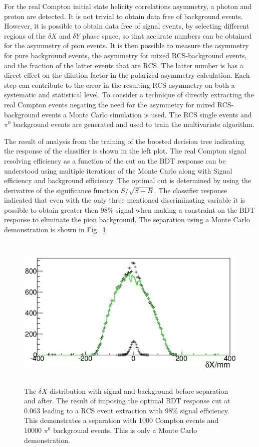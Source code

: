 For the real Compton initial state helicity correlations asymmetry, a photon and proton are detected.
It is not trivial to obtain data free of background events. However, it is possible to obtain
data free of signal events, by selecting different regions of the $\delta X$ and $\delta Y$ phase
space, so that accurate numbers can be obtained for the asymmetry of
pion events. It is then possible to measure the asymmetry for pure background events, the asymmetry for mixed
RCS-background events, and the fraction of the latter events that are RCS.  The latter number is
has a direct effect on the dilution factor in the polarized asymmetry calculation.
Each step can contribute to the error in the resulting RCS asymmetry on both a systematic 
and statistical level.  To consider a technique of
directly extracting the real Compton events negating the need for the asymmetry for mixed
RCS-background events a Monte Carlo simulation is used.  The RCS single events and $\pi^0$ background
events are generated and used to train the multivariate algorithm. 

The result of analysis from the training
of the boosted decision tree indicating the response of the classifier is shown in the left plot.
The real Compton signal resolving efficiency as a function of the cut on the BDT response can be understood using
multiple iterations of the Monte Carlo along with Signal efficiency and background efficiency.  The optimal cut is determined by
using the derivative of the significance function $S/\sqrt{S+B}$.
The classifier response indicated that even with the only three mentioned
discriminating variable it is possible to obtain greater then 98\% signal
when making a constraint on the BDT response to eliminate the pion
background.  The separation using a Monte Carlo demonstration is shown in Fig.~\ref{fig:d11}  
\begin{figure}[h]
\begin{center}
\includegraphics[height=75mm, angle=0]{./figs/d11}
\caption{The $\delta X$ distribution with signal and background before separation and after.
The result of imposing the optimal BDT response cut at 0.063 leading to a RCS event extraction
with 98\% signal efficiency.  This demonstrates a separation with 1000 Compton events and 10000 $\pi^0$ background events.
This is only a Monte Carlo demonstration.}
\label{fig:d11}
\end{center}
\end{figure}

